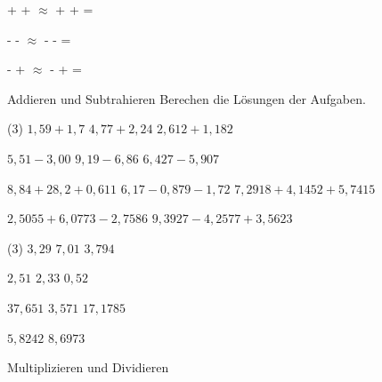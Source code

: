 \documentclass[12pt,a5paper,landscape]{scrartcl}
\begin{document}
	\begin{loesungskarte}
	\begin{enumeratea}
		\item {} +  +  $\approx$  +  +  = 
		\item {} -  -  $\approx$  -  -  = 
		\item {} -  +  $\approx$  -  +  = 
	\end{enumeratea}
	\end{loesungskarte}
	
	\begin{karte1}{Addieren und Subtrahieren}
		Berechen die Lösungen der Aufgaben.
		
		\begin{tasks}(3)
			\task $1,59 + 1,7$
			\task $4,77 + 2,24$
			\task $2,612 + 1,182$
			
			\task $5,51 - 3,00$
			\task $9,19 - 6,86$
			\task $6,427 - 5,907$
			
			\task $8,84 + 28,2 + 0,611$
			\task $6,17 - 0,879 - 1,72$
			\task $7,2918 + 4,1452 + 5,7415$
			
			\task $2,5055 + 6,0773 - 2,7586$
			\task $9,3927 - 4,2577 + 3,5623$
		\end{tasks}
	\end{karte1}
	
	\begin{loesungskarte}
		\begin{tasks}(3)
			\task $3,29$
			\task $7,01$
			\task $3,794$
			
			\task $2,51$
			\task $2,33$
			\task $0,52$
			
			\task $37,651$
			\task $3,571$
			\task $17,1785$
			
			\task $5,8242$
			\task $8,6973$
		\end{tasks}
	\end{loesungskarte}
	
	\begin{karte1}{Multiplizieren und Dividieren}
	\end{karte1}
	
	\begin{loesungskarte}
	\end{loesungskarte}
	
\end{document}
